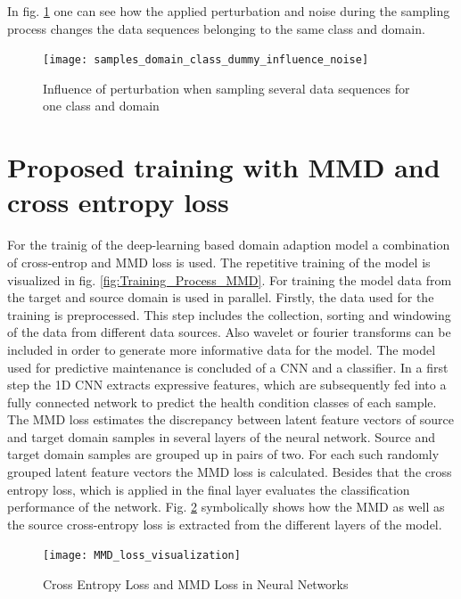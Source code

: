 In fig. \ref{fig:samples_domain_class_dummy_influence_noise} one can see how the applied perturbation and noise during the sampling process changes the data sequences belonging to the same class and domain. 


\begin{figure}[htpb]
  \centering
  \texttt{[image: samples\_domain\_class\_dummy\_influence\_noise]}
  \caption {Influence of perturbation when sampling several data sequences for one class and domain}
  \label{fig:samples_domain_class_dummy_influence_noise}
\end{figure}
\FloatBarrier 



\section{Proposed training with MMD and cross entropy loss} \label{sec:Proposed_training}

For the trainig of the deep-learning based domain adaption model a combination of cross-entrop and MMD loss is used. The repetitive training of the model is visualized in fig. \ref{fig:Training_Process_MMD}. For training the model data from the target and source domain is used in parallel. Firstly, the data used for the training is preprocessed. This step includes the collection, sorting and windowing of the data from different data sources. Also wavelet or fourier transforms can be included in order to generate more informative data for the model. The model used for predictive maintenance is concluded of a CNN and a classifier. In a first step the 1D CNN extracts expressive features, which are subsequently fed into a fully connected network to predict the health condition classes of each sample. The MMD loss estimates the discrepancy between latent feature vectors of source and target domain samples in several layers of the neural network. Source and target domain samples are grouped up in pairs of two. For each such randomly grouped latent feature vectors the MMD loss is calculated. Besides that the cross entropy loss, which is applied in the final layer evaluates the classification performance of the network. Fig. \ref{fig:MMD_Loss_and_CE_loss} symbolically shows how the MMD as well as the source cross-entropy loss is extracted from the different layers of the model.

\begin{figure}[htpb]
  \centering
  \texttt{[image: MMD\_loss\_visualization]}
  \caption {Cross Entropy Loss and MMD Loss in Neural Networks} \label{fig:MMD_Loss_and_CE_loss}
\end{figure}
\FloatBarrier 


